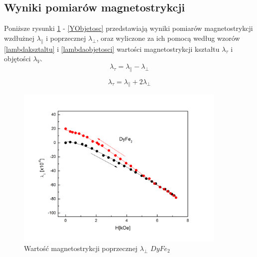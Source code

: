 \documentclass[a4paper,12pt]{article}
\numberwithin{equation}{section}
\begin{document}
\newpage
\subsection{Wyniki pomiarów magnetostrykcji}

Poniższe rysunki \ref{Dypoprzeczna} - \ref{YObjetosc} przedstawiają wyniki pomiarów magnetostrykcji wzdłużnej
 $\lambda_{\parallel}$ i poprzecznej $\lambda_{\perp}$, 
oraz wyliczone za ich pomocą według wzorów \ref{lambdaksztaltu} i \ref{lambdaobjetosci} wartości magnetostrykcji kształtu $\lambda_{\tau}$  i objętości $\lambda_{V}$.
 \begin{equation}
    \lambda_{\tau}=\lambda_{\parallel} - \lambda_{\perp}
    \label{lambdaksztaltu}
  \end{equation}

  \begin{equation}
    \lambda_{\tau}=\lambda_{\parallel} + 2\lambda_{\perp}
    \label{lambdaobjetosci}
  \end{equation}

 


\begin{figure}[h]
    \centering
    \includegraphics[width =0.9\textwidth]{../img/magneto/Dypoprzeczna}
    \caption{Wartość magnetostrykcji poprzecznej $\lambda_{\perp}$ $DyFe_2$}
    \label{Dypoprzeczna}
\end{figure}
\end{document}
